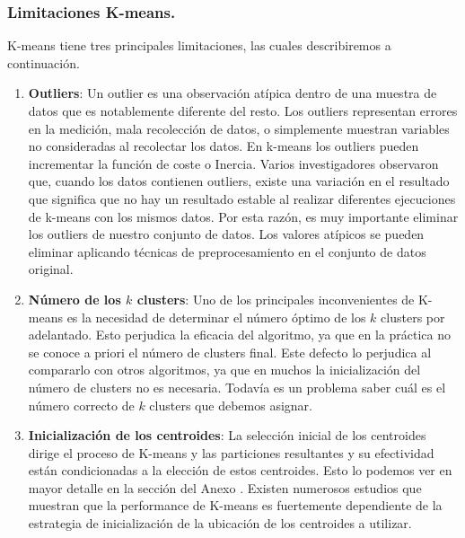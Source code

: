 \documentclass[12pt,a4paper]{article}
\begin{document}
\begin{sloppypar}
\cleardoublepage
\subsubsection{Limitaciones K-means.}\label{limit_kmeans}

K-means tiene tres principales limitaciones, las cuales describiremos a continuación.

\begin{enumerate}

\item \textbf{Outliers}: Un outlier es una observación atípica dentro de una muestra de datos que es notablemente diferente del resto. Los outliers representan errores en la medición, mala recolección de datos, o simplemente muestran variables no consideradas al recolectar los datos.
En k-means los outliers pueden incrementar la función de coste o Inercia. Varios investigadores observaron que, cuando los datos contienen outliers, existe una variación en el resultado que significa que no hay un resultado estable al realizar diferentes ejecuciones de k-means con los mismos datos\cite{K_means_review}. Por esta razón, es muy importante eliminar los outliers de nuestro conjunto de datos. Los valores atípicos se pueden eliminar aplicando técnicas de preprocesamiento en el conjunto de datos original.

\item \textbf{Número de los $k$ clusters}: Uno de los principales inconvenientes de K-means es la necesidad de determinar el número óptimo de los $k$ clusters por adelantado. Esto perjudica la eficacia del algoritmo, ya que en la práctica no se conoce a priori el número de clusters final. Este defecto lo perjudica al compararlo con otros algoritmos, ya que en muchos la inicialización del número de clusters no es necesaria. Todavía es un problema saber cuál es el número correcto de $k$ clusters que debemos asignar\cite{K_means_review}.

\item \textbf{Inicialización de los centroides}: La selección inicial de los centroides dirige el proceso de K-means y las particiones resultantes y su efectividad están condicionadas a la elección de estos centroides\cite{K_means_experiment}. Esto lo podemos ver en mayor detalle en la sección del Anexo \textit{}. Existen numerosos estudios\cite{K_means_initial_centroids} que muestran que la performance de K-means es fuertemente dependiente de la estrategia de inicialización de la ubicación de los centroides a utilizar.


\end{enumerate}
\end{sloppypar}
\end{document}
